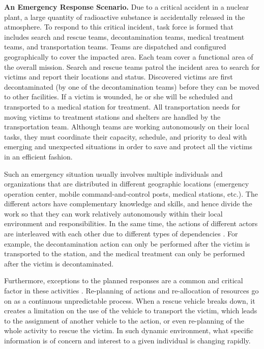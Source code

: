 \begin{scenario}
\textbf{An Emergency Response Scenario.} 
Due to a critical accident in a nuclear plant, a large quantity of radioactive substance is accidentally released in the atmosphere. To respond to this critical incident, task force is formed that includes search and rescue teams, decontamination teams, medical treatment teams, and transportation teams. Teams are dispatched and configured geographically to cover the impacted area. Each team cover a functional area of the overall mission.  Search and rescue teams patrol the incident area to search for victims and report their locations and status. Discovered victims are first decontaminated (by one of the decontamination teams) before they can be moved to other facilities.  If a victim is wounded, he or she will be scheduled and transported to a medical station for treatment. All transportation needs for moving victims to treatment stations and shelters are handled by the transportation team. Although teams are working autonomously on their local tasks, they must coordinate their capacity, schedule, and priority to deal with emerging and unexpected situations in order to save and protect all the victims in an efficient fashion.
\end{scenario}

Such an emergency situation usually involves multiple individuals and organizations that are distributed in different geographic locations (emergency operation center, mobile command-and-control posts, medical stations, etc.). The different actors have complementary knowledge and skills, and hence divide the work so that they can work relatively autonomously within their local environment and responsibilities. In the same time, the actions of different actors are interleaved with each other due to different types of dependencies \cite{shen2004managing}. For example, the decontamination action can only be performed after the victim is transported to the station, and the medical treatment can only be performed after the victim is decontaminated.

Furthermore, exceptions to the planned responses are a common and critical factor in these activities \cite{Turoff2004}. Re-planning of actions and re-allocation of resources go on as a continuous unpredictable process. When a rescue vehicle breaks down, it creates a limitation on the use of the vehicle to transport the victim, which leads to the assignment of another vehicle to the action, or even re-planning of the whole activity to rescue the victim. In such dynamic environment, what specific information is of concern and interest to a given individual is changing rapidly.

